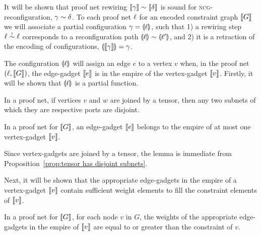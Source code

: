 \documentclass[conference]{IEEEtran}
\begin{document}
It will be shown that proof net rewiring $\itn\gamma\perm\itn\delta$ is sound for \textsc{ncg}-reconfiguration, $\gamma\perm\delta$.
%
To each proof net $\ell$ for an encoded constraint graph $\llbracket G\rrbracket$ we will associate a partial configuration $\gamma=\llparenthesis\ell\rrparenthesis$, such that 1) a rewiring step $\links\perm*\links$ corresponds to a reconfiguration path $\coitn\links\perm\coitn{\links'}$, and 2) it is a retraction of the encoding of configurations, $\llparenthesis\llbracket\gamma\rrbracket\rrparenthesis=\gamma$.



The configuration $\llparenthesis\ell\rrparenthesis$ will assign an edge $e$ to a vertex $v$ when, in the proof net $(\ell,\llbracket G\rrbracket)$, the edge-gadget $\llbracket e\rrbracket$ is in the empire of the vertex-gadget $\llbracket v\rrbracket$.
%
Firstly, it will be shown that $\llparenthesis\ell\rrparenthesis$ is a partial function.


\begin{proposition}
\label{prop:tensor has disjoint subnets}
In a proof net, if vertices $v$ and $w$ are joined by a tensor, then any two subnets of which they are respective ports are disjoint.
\end{proposition}


\begin{lemma}
In a proof net for $\llbracket G\rrbracket$, an edge-gadget $\llbracket e\rrbracket$ belongs to the empire of at most one vertex-gadget $\llbracket v\rrbracket$.
\end{lemma}

\begin{IEEEproof}
Since vertex-gadgets are joined by a tensor, the lemma is immediate from Proposition~\ref{prop:tensor has disjoint subnets}.
\end{IEEEproof}


Next, it will be shown that the appropriate edge-gadgets in the empire of a vertex-gadget $\llbracket v\rrbracket$ contain sufficient weight elements to fill the constraint elements of $\llbracket v\rrbracket$.


\begin{lemma}
\label{lem:appropriate edge weights}
In a proof net for $\llbracket G\rrbracket$, for each node $v$ in $G$, the weights of the appropriate edge-gadgets in the empire of $\llbracket v\rrbracket$ are equal to or greater than the constraint of $v$.
\end{lemma}
\end{document}

